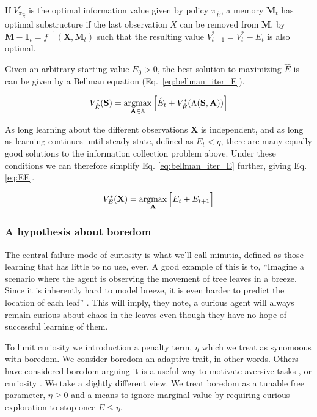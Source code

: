 \begin{definition} \label{theorem:opt_sub} 
   If $V^*_{\pi_{\hat E}}$ is the optimal information value given by policy $\pi_{\hat E}$, a memory $\mathbf{M}_t$ has optimal substructure if the last observation $X$ can be removed from $\mathbf{M}$, by $\mathbf{M-1}_{t} = f^{-1}(\mathbf{X}, \mathbf{M}_t)$ such that the resulting value $V^*_{t-1} = V^*_{t} - E_{t}$ is also optimal. 
\end{definition}

Given an arbitrary starting value $E_0 > 0$, the best solution to maximizing $\hat E$ is can be given by a Bellman equation (Eq.~\ref{eq:bellman_iter_E}).

\begin{equation} 
	\label{eq:bellman_iter_E}
	V^*_{\hat E}(\mathbf{S}) = \operatorname*{argmax}_{\mathbf{A} \in \mathbb{A}} \Big [ \hat E_{t}  + V^*_{\hat E}(\Lambda(\mathbf{S},\mathbf{A})) \Big ]
\end{equation}

As long learning about the different observations $\mathbf{X}$ is independent, and as long as learning continues until steady-state, defined as $E_t < \eta$, there are many equally good solutions to the information collection problem above. Under these conditions we can therefore simplify Eq. \ref{eq:bellman_iter_E} further, giving Eq. \ref{eq:EE}. 

\begin{equation}
	\label{eq:EE} 
	V_E^{*}(\mathbf{X}) = \operatorname*{argmax}_{\mathbf{A}} \Big [ E_t + E_{t+1} \Big ]
\end{equation}

\subsubsection*{A hypothesis about boredom}
The central failure mode of curiosity is what we'll call minutia, defined as those learning that has little to no use, ever. A good example of this is to, ``Imagine a scenario where the agent is observing the movement of tree leaves in a breeze. Since it is inherently hard to model breeze, it is even harder to predict the location of each leaf'' \cite{Pathak2017}. This will imply, they note, a curious agent will always remain curious about chaos in the leaves even though they have no hope of successful learning of them.

To limit curiosity we introduction a penalty term, $\eta$ which we treat as synomoous with boredom. We consider boredom an adaptive trait, in other words. Others have considered boredom arguing it is a useful way to motivate aversive tasks \citep{Bench2013}, or curiosity \cite{Loewenstein1994}. We take a slightly different view. We treat boredom as a tunable free parameter, $\eta \ge 0$ and a means to ignore marginal value by requiring curious exploration to stop once $E \le \eta$. 


